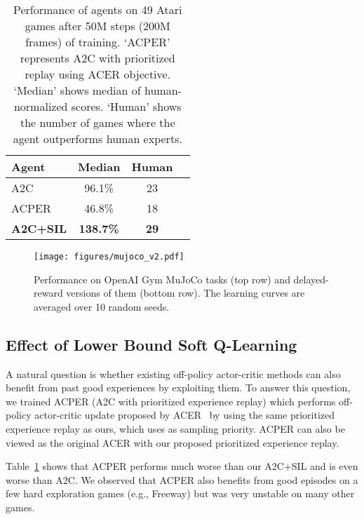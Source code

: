 \documentclass{article}
\newcommand{\cutsubsectionup}{\vspace*{-0.05in}}\newcommand{\cutsubsectiondown}{\vspace*{-0.05in}}
\begin{document}
\begin{table}
\caption{Performance of agents on 49 Atari games after 50M steps (200M frames) of training. `ACPER' represents A2C with prioritized replay using ACER objective. `Median' shows median of human-normalized scores. `Human' shows the number of games where the agent outperforms human experts. }
\label{tab:atari}
\begin{center}
\begin{small}
\begin{sc}
\begin{tabular}{lccc}
\toprule
Agent & Median & Human \\
\midrule
A2C & 96.1\% & 23 \\
ACPER & 46.8\% & 18 \\
\midrule
\textbf{A2C+SIL} & \textbf{138.7\%} & \textbf{29} \\
\bottomrule
\end{tabular}
\end{sc}
\end{small}
\end{center}
\vskip -0.3in
\end{table}

\begin{figure*}
	\centering
	\texttt{[image: figures/mujoco\_v2.pdf]}
	\vspace{-0.1in}
	\caption{Performance on OpenAI Gym MuJoCo tasks (top row) and delayed-reward versions of them (bottom row). The learning curves are averaged over 10 random seeds.}
	\label{fig:mujoco}
	\vskip -0.1in
\end{figure*}

\cutsubsectionup
\subsection{Effect of Lower Bound Soft Q-Learning}
\cutsubsectiondown
A natural question is whether existing off-policy actor-critic methods can also benefit from past good experiences by exploiting them. To answer this question, we trained ACPER (A2C with prioritized experience replay) which performs off-policy actor-critic update proposed by ACER~\citep{Wang2016SampleEA} by using the same prioritized experience replay as ours, which uses  as sampling priority. ACPER can also be viewed as the original ACER with our proposed prioritized experience replay. 

Table~\ref{tab:atari} shows that ACPER performs much worse than our A2C+SIL and is even worse than A2C. We observed that ACPER also benefits from good episodes on a few hard exploration games (e.g., Freeway) but was very unstable on many other games. 
\end{document}
